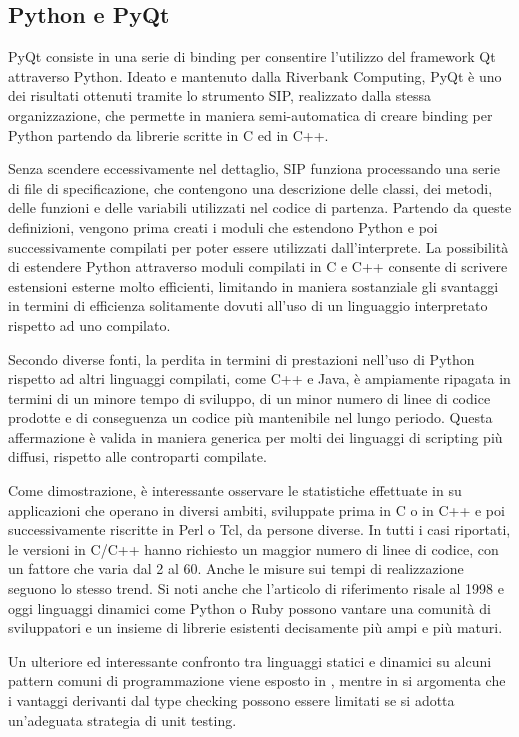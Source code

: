 \subsection{Python e PyQt}

PyQt consiste in una serie di binding per consentire l'utilizzo del framework Qt attraverso Python. Ideato e mantenuto dalla Riverbank Computing, PyQt è uno dei risultati ottenuti tramite lo strumento SIP, realizzato dalla stessa organizzazione, che permette in maniera semi-automatica di creare binding per Python partendo da librerie scritte in C ed in C++. 

Senza scendere eccessivamente nel dettaglio, SIP funziona processando una serie di file di specificazione, che contengono una descrizione delle classi, dei metodi, delle funzioni e delle variabili utilizzati nel codice di partenza. Partendo da queste definizioni, vengono prima creati i moduli che estendono Python e poi successivamente compilati per poter essere utilizzati dall'interprete. La possibilità di estendere Python attraverso moduli compilati in C e C++ consente di scrivere estensioni esterne molto efficienti, limitando in maniera sostanziale gli svantaggi in termini di efficienza solitamente dovuti all'uso di un linguaggio interpretato rispetto ad uno compilato.

Secondo diverse fonti, la perdita in termini di prestazioni nell'uso di Python rispetto ad altri linguaggi compilati, come C++ e Java, è ampiamente ripagata in termini di un minore tempo di sviluppo, di un minor numero di linee di codice prodotte e di conseguenza un codice più mantenibile nel lungo periodo. Questa affermazione è valida in maniera generica per molti dei linguaggi di scripting più diffusi, rispetto alle controparti compilate. 

Come dimostrazione, è interessante osservare le statistiche effettuate in \cite{Ousterhout} su applicazioni che operano in diversi ambiti, sviluppate prima in C o in C++ e poi successivamente riscritte in Perl o Tcl, da persone diverse. In tutti i casi riportati, le versioni in C/C++ hanno richiesto un maggior numero di linee di codice, con un fattore che varia dal 2 al 60. Anche le misure sui tempi di realizzazione seguono lo stesso trend. Si noti anche che l'articolo di riferimento risale al 1998 e oggi linguaggi dinamici come Python o Ruby possono vantare una comunità di sviluppatori e un insieme di librerie esistenti decisamente più ampi e più maturi. 

Un ulteriore ed interessante confronto tra linguaggi statici e dinamici su alcuni pattern comuni di programmazione viene esposto in \cite{dynamicStaticPattern}, mentre in \cite{martinDynamic} si argomenta che i vantaggi derivanti dal type checking possono essere limitati se si adotta un'adeguata strategia di unit testing.


